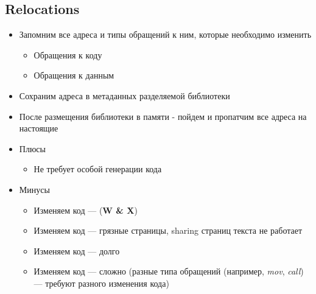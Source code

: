 \documentclass[../../lectures.tex]{subfiles}
\begin{document}
\subsection{Relocations}
\begin{itemize}
    \item Запомним все адреса и типы обращений к ним, которые необходимо изменить
        \begin{itemize}
            \item Обращения к коду
            \item Обращения к данным
        \end{itemize}
    \item Сохраним адреса в метаданных разделяемой библиотеки
    \item После размещения библиотеки в памяти - пойдем и пропатчим все адреса на настоящие
    \item Плюсы
        \begin{itemize}
            \item Не требует особой генерации кода
        \end{itemize}
    \item Минусы
        \begin{itemize}
            \item Изменяем код --- (\textbf{W \& X})
            \item Изменяем код --- грязные страницы, sharing страниц текста не работает
            \item Изменяем код --- долго
            \item Изменяем код --- сложно (разные типа обращений (например, \emph{mov}, \emph{call}) --- требуют разного изменения кода)
        \end{itemize}
\end{itemize}
\end{document}
